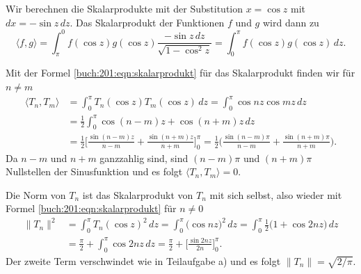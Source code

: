 \begin{loesung}
\begin{teilaufgaben}
\item
Wir berechnen die Skalarprodukte mit der Substitution $x=\cos z$
mit $dx = -\sin z \,dz$.
Das Skalarprodukt der Funktionen $f$ und $g$ wird dann zu
\begin{equation}
\langle f,g\rangle
=
\int_\pi^0 f(\cos z) g(\cos z) \frac{-\sin z \,dz}{\sqrt{1-\cos^2z}}
=
\int_0^\pi f(\cos z) g(\cos z) \,dz.
\label{buch:201:eqn:skalarprodukt}
\end{equation}
\item
Mit der Formel \eqref{buch:201:eqn:skalarprodukt} für das
Skalarprodukt finden wir für $n\ne m$
\begin{align*}
\langle T_n,T_m\rangle
&=
\int_0^\pi T_n(\cos z)T_m(\cos z)\,dz
=
\int_0^\pi \cos nz \cos mz\,dz
\\
&=
\frac12 \int_0^\pi \cos(n-m)z +\cos (n+m)z\,dz
\\
&=
\frac12\biggl[\frac{\sin(n-m)z}{n-m} + \frac{\sin(n+m)z}{n+m}\biggr]_0^\pi
=
\frac12\biggl(\frac{\sin(n-m)\pi}{n-m} + \frac{\sin(n+m)\pi}{n+m}\biggr).
\end{align*}
Da $n-m$ und $n+m$ ganzzahlig sind, sind $(n-m)\pi$ und $(n+m)\pi$
Nullstellen der Sinusfunktion und es folgt $\langle T_n,T_m\rangle = 0$.
\item
Die Norm von $T_n$ ist das Skalarprodukt von $T_n$ mit sich selbst,
also wieder mit Formel \eqref{buch:201:eqn:skalarprodukt} für $n\ne 0$
\begin{align*}
\|T_n\|^2
&=
\int_0^\pi T_n(\cos z)^2\,dz
=
\int_0^\pi \bigl( \cos nz\bigr)^2\,dz
=
\int_0^\pi \frac12\bigl(1 + \cos 2nz\bigr)\,dz
\\
&=
\frac{\pi}{2} + \int_0^\pi \cos 2nz\,dz
=
\frac{\pi}{2} + \biggl[\frac{\sin 2nz}{2n}\biggr]_0^\pi.
\end{align*}
Der zweite Term verschwindet wie in Teilaufgabe a) und es folgt
$\|T_n\|=\sqrt{2/\pi}$.


\end{teilaufgaben}
\end{loesung}
